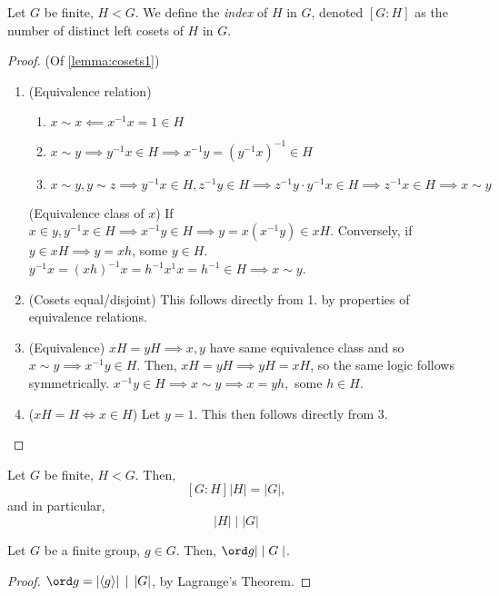 \documentclass[12pt,oneside]{article}
\begin{document}
\begin{definition}
  Let $G$ be finite, $H < G$. We define the \emph{index} of $H$ in $G$, denoted $[G : H]$ as the number of distinct left cosets of $H$ in $G$.
\end{definition}

\begin{proof}(Of \cref{lemma:cosets1})
  \begin{enumerate}
    \item (Equivalence relation) 
    \begin{enumerate}
      \item $x\sim x \impliedby x^{-1}x = 1 \in H$
      \item $x \sim y \implies y^{-1}x \in H \implies x^{-1}y = (y^{-1}x)^{-1} \in H$
      \item $x \sim y, y \sim z \implies y^{-1}x \in H, z^{-1}y \in H \implies z^{-1}y\cdot y^{-1}x \in H \implies z^{-1}x \in H \implies x \sim y$
    \end{enumerate}
    (Equivalence class of $x$) If $x \in y, y^{-1}x \in H \implies x^{-1}y \in H \implies y = x (x^{-1}y) \in xH$. Conversely, if $y \in xH \implies y = xh$, some $y \in H$. $y^{-1}x = (xh)^{-1} x = h^{-1}x^{1}x = h^{-1} \in H \implies x \sim y$.
    \item (Cosets equal/disjoint) This follows directly from 1. by properties of equivalence relations.
    \item (Equivalence) $xH = yH \implies x, y$ have same equivalence class and so $x \sim y \implies x^{-1}y \in H$. Then, $xH = yH \implies yH = xH$, so the same logic follows symmetrically. $x^{-1}y \in H \implies x \sim y \implies x = y h,$ some $h \in H$.
    \item ($xH = H \iff x \in H$) Let $y = 1$. This then follows directly from 3.
  \end{enumerate}
\end{proof}

\begin{theorem}\label{thm:lagrange}
  Let $G$ be finite, $H < G$. Then,
  \[[G:H]|H| = |G|,\] and in particular, \[|H|\mid|G|\]
\end{theorem}

\begin{corollary}
  Let $G$ be a finite group, $g \in G$. Then, $\ord g |\mid G\mid$.
\end{corollary}
\begin{proof}
  $\ord g = |\langle g\rangle| \,\mid\,|G|$, by Lagrange's Theorem.
\end{proof}
\end{document}
